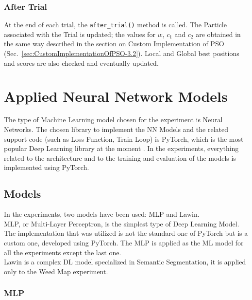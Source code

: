 \subsubsection{After Trial}

At the end of each trial, the \texttt{after\_trial()} method is called.
The Particle associated with the Trial is updated; the values for $w$, $c_1$ and $c_2$ are obtained in the same way described in the section on Custom Implementation of PSO (Sec.~\ref{sec:CustomImplementationOfPSO-3.2}).
Local and Global best positions and scores are also checked and eventually updated.

\section{Applied Neural Network Models}

The type of Machine Learning model chosen for the experiment is Neural Networks.
The chosen library to implement the NN Models and the related support code (such as Loss Function, Train Loop) is PyTorch, which is the most popular Deep Learning library at the moment \cite{PyTorch}.
In the experiments, everything related to the architecture and to the training and evaluation of the models is implemented using PyTorch.

\subsection{Models}

In the experiments, two models have been used: MLP and Lawin.
\\[0.3cm]MLP, or Multi-Layer Perceptron, is the simplest type of Deep Learning Model. The implementation that was utilized is not the standard one of PyTorch but is a custom one, developed using PyTorch. The MLP is applied as the ML model for all the experiments except the last one.
\\[0.3cm]Lawin is a complex DL model specialized in Semantic Segmentation, it is applied only to the Weed Map experiment.

\subsubsection{MLP}

